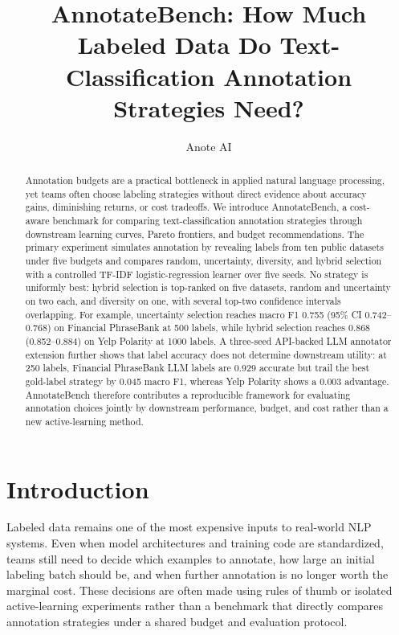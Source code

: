 \documentclass[11pt]{article}
\title{AnnotateBench: How Much Labeled Data Do Text-Classification Annotation Strategies Need?}
\author{Anote AI}
\date{}
\begin{document}
\maketitle

\begin{abstract}
Annotation budgets are a practical bottleneck in applied natural language processing, yet teams often choose labeling strategies without direct evidence about accuracy gains, diminishing returns, or cost tradeoffs. We introduce AnnotateBench, a cost-aware benchmark for comparing text-classification annotation strategies through downstream learning curves, Pareto frontiers, and budget recommendations. The primary experiment simulates annotation by revealing labels from ten public datasets under five budgets and compares random, uncertainty, diversity, and hybrid selection with a controlled TF-IDF logistic-regression learner over five seeds. No strategy is uniformly best: hybrid selection is top-ranked on five datasets, random and uncertainty on two each, and diversity on one, with several top-two confidence intervals overlapping. For example, uncertainty selection reaches macro F1 0.755 (95\% CI 0.742--0.768) on Financial PhraseBank at 500 labels, while hybrid selection reaches 0.868 (0.852--0.884) on Yelp Polarity at 1000 labels. A three-seed API-backed LLM annotator extension further shows that label accuracy does not determine downstream utility: at 250 labels, Financial PhraseBank LLM labels are 0.929 accurate but trail the best gold-label strategy by 0.045 macro F1, whereas Yelp Polarity shows a 0.003 advantage. AnnotateBench therefore contributes a reproducible framework for evaluating annotation choices jointly by downstream performance, budget, and cost rather than a new active-learning method.
\end{abstract}

\section{Introduction}

Labeled data remains one of the most expensive inputs to real-world NLP systems. Even when model architectures and training code are standardized, teams still need to decide which examples to annotate, how large an initial labeling batch should be, and when further annotation is no longer worth the marginal cost. These decisions are often made using rules of thumb or isolated active-learning experiments rather than a benchmark that directly compares annotation strategies under a shared budget and evaluation protocol.
\end{document}
